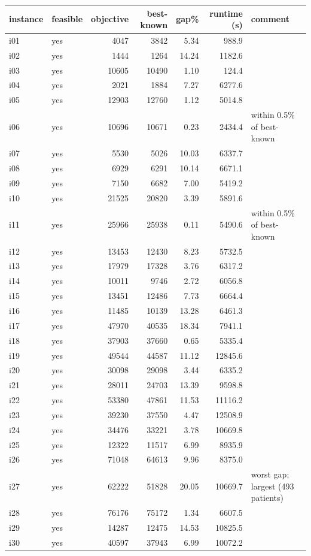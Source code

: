 \begin{center}\small
\begin{tabular}{@{}l l r r r r p{3.0cm}@{}}
\toprule
instance & feasible & objective & best-known & gap\% & runtime (s) & comment\\
\midrule
i01 & yes & 4047 & 3842 & 5.34 & 988.9 & \\
i02 & yes & 1444 & 1264 & 14.24 & 1182.6 & \\
i03 & yes & 10605 & 10490 & 1.10 & 124.4 & \\
i04 & yes & 2021 & 1884 & 7.27 & 6277.6 & \\
i05 & yes & 12903 & 12760 & 1.12 & 5014.8 & \\
i06 & yes & 10696 & 10671 & 0.23 & 2434.4 & within 0.5\% of best-known\\
i07 & yes & 5530 & 5026 & 10.03 & 6337.7 & \\
i08 & yes & 6929 & 6291 & 10.14 & 6671.1 & \\
i09 & yes & 7150 & 6682 & 7.00 & 5419.2 & \\
i10 & yes & 21525 & 20820 & 3.39 & 5891.6 & \\
i11 & yes & 25966 & 25938 & 0.11 & 5490.6 & within 0.5\% of best-known\\
i12 & yes & 13453 & 12430 & 8.23 & 5732.5 & \\
i13 & yes & 17979 & 17328 & 3.76 & 6317.2 & \\
i14 & yes & 10011 & 9746 & 2.72 & 6056.8 & \\
i15 & yes & 13451 & 12486 & 7.73 & 6664.4 & \\
i16 & yes & 11485 & 10139 & 13.28 & 6461.3 & \\
i17 & yes & 47970 & 40535 & 18.34 & 7941.1 & \\
i18 & yes & 37903 & 37660 & 0.65 & 5335.4 & \\
i19 & yes & 49544 & 44587 & 11.12 & 12845.6 & \\
i20 & yes & 30098 & 29098 & 3.44 & 6335.2 & \\
i21 & yes & 28011 & 24703 & 13.39 & 9598.8 & \\
i22 & yes & 53380 & 47861 & 11.53 & 11116.2 & \\
i23 & yes & 39230 & 37550 & 4.47 & 12508.9 & \\
i24 & yes & 34476 & 33221 & 3.78 & 10669.8 & \\
i25 & yes & 12322 & 11517 & 6.99 & 8935.9 & \\
i26 & yes & 71048 & 64613 & 9.96 & 8375.0 & \\
i27 & yes & 62222 & 51828 & 20.05 & 10669.7 & worst gap; largest (493 patients)\\
i28 & yes & 76176 & 75172 & 1.34 & 6607.5 & \\
i29 & yes & 14287 & 12475 & 14.53 & 10825.5 & \\
i30 & yes & 40597 & 37943 & 6.99 & 10072.2 & \\
\bottomrule
\end{tabular}
\end{center}
